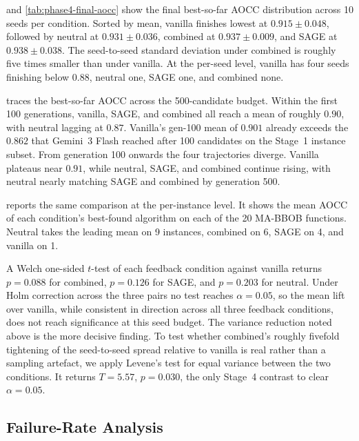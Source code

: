  and \cref{tab:phase4-final-aocc} show the final best-so-far AOCC distribution across 10 seeds per condition. Sorted by mean, vanilla finishes lowest at $0.915 \pm 0.048$, followed by neutral at $0.931 \pm 0.036$, combined at $0.937 \pm 0.009$, and SAGE at $0.938 \pm 0.038$. The seed-to-seed standard deviation under combined is roughly five times smaller than under vanilla. At the per-seed level, vanilla has four seeds finishing below $0.88$, neutral one, SAGE one, and combined none.

 traces the best-so-far AOCC across the 500-candidate budget. Within the first 100 generations, vanilla, SAGE, and combined all reach a mean of roughly $0.90$, with neutral lagging at $0.87$. Vanilla's gen-100 mean of $0.901$ already exceeds the $0.862$ that Gemini~3 Flash reached after 100 candidates on the Stage~1 instance subset. From generation 100 onwards the four trajectories diverge. Vanilla plateaus near $0.91$, while neutral, SAGE, and combined continue rising, with neutral nearly matching SAGE and combined by generation 500.

 reports the same comparison at the per-instance level. It shows the mean AOCC of each condition's best-found algorithm on each of the 20 MA-BBOB functions. Neutral takes the leading mean on 9 instances, combined on 6, SAGE on 4, and vanilla on 1.

A Welch one-sided $t$-test of each feedback condition against vanilla returns $p = 0.088$ for combined, $p = 0.126$ for SAGE, and $p = 0.203$ for neutral. Under Holm correction across the three pairs no test reaches $\alpha = 0.05$, so the mean lift over vanilla, while consistent in direction across all three feedback conditions, does not reach significance at this seed budget. The variance reduction noted above is the more decisive finding. To test whether combined's roughly fivefold tightening of the seed-to-seed spread relative to vanilla is real rather than a sampling artefact, we apply Levene's test for equal variance between the two conditions. It returns $T = 5.57$, $p = 0.030$, the only Stage~4 contrast to clear $\alpha = 0.05$.

\subsection{Failure-Rate Analysis}
\label{sec:results-stage4-failures}

